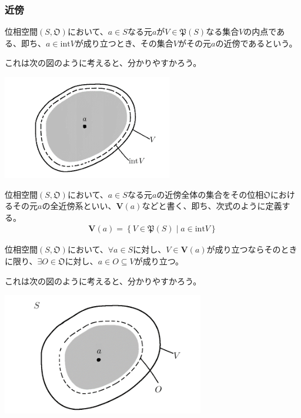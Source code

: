 \documentclass[dvipdfmx]{jsarticle}
\begin{document}
\subsubsection{近傍}%
\begin{dfn}
位相空間$\left( S,\mathfrak{O} \right)$において、$a \in S$なる元$a$が$V \in \mathfrak{P}(S)$なる集合$V$の内点である、即ち、$a \in {\mathrm{int}}V$が成り立つとき、その集合$V$がその元$a$の近傍であるという。
\end{dfn}\par
これは次の図のように考えると、分かりやすかろう。
\begin{center}
  \includegraphics[width=74mm]{8.1.1.h.png}
\end{center}
\begin{dfn}
位相空間$\left( S,\mathfrak{O} \right)$において、$a \in S$なる元$a$の近傍全体の集合をその位相$\mathfrak{O}$におけるその元$a$の全近傍系といい、$\mathbf{V}(a)$などと書く、即ち、次式のように定義する。
\begin{align*}
\mathbf{V}(a) = \left\{ V \in \mathfrak{P}(S) \middle| a \in {\mathrm{int}}V \right\}
\end{align*}
\end{dfn}
\begin{thm}\label{8.1.1.22}
位相空間$\left( S,\mathfrak{O} \right)$において、$\forall a \in S$に対し、$V \in \mathbf{V}(a)$が成り立つならそのときに限り、$\exists O \in \mathfrak{O}$に対し、$a \in O \subseteq V$が成り立つ。
\end{thm}\par
これは次の図のように考えると、分かりやすかろう。
\begin{center}
  \includegraphics[width=88mm]{8.1.1.i.PNG}
\end{center}
\end{document}
